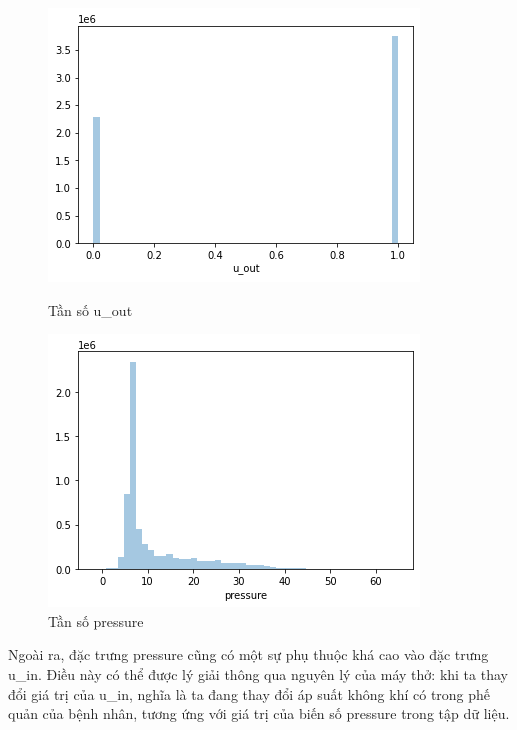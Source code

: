 \documentclass{article}
\begin{document}
\begin{figure}[h!]
  \centering
  \begin{minipage}[b]{0.2\textwidth}
    \includegraphics[width=\textwidth]{u_out.png}
    \caption{Tần số u\_out}
    \label{fig:u_out}
  \end{minipage}
  \hfill
  \begin{minipage}[b]{0.2\textwidth}
    \includegraphics[width=\textwidth]{pressure.png}
    \caption{Tần số pressure}
    \label{fig:pressure}
  \end{minipage}
\end{figure}

Ngoài ra, đặc trưng pressure cũng có một sự phụ thuộc khá cao vào đặc trưng u\_in. Điều này có thể được lý giải thông qua nguyên lý của máy thở: khi ta thay đổi giá trị của u\_in, nghĩa là ta đang thay đổi áp suất không khí có trong phế quản của bệnh nhân, tương ứng với giá trị của biến số pressure trong tập dữ liệu. 
\end{document}
